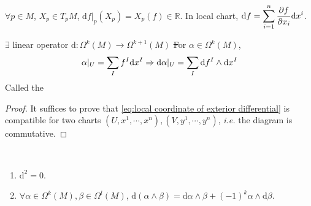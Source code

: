 $ \forall p\in M $,  $ X_p\in T_pM $,  $ \mathrm{d}f|_p(X_p)=X_p(f)\in \mathbb{R} $.
In local chart,  $ \mathrm{d}f=\displaystyle\sum_{i=1}^n\frac{\partial f}{\partial x_i}\mathrm{d}x^i $.
\begin{theorem}
    $ \exists $ linear operator  $ \mathrm{d}:\Omega^k(M)\rightarrow \Omega^{k+1}(M) $  \st
    For $ \alpha\in \Omega^k(M) $,
    \begin{equation}
        \alpha|_U=\displaystyle\sum_If^I\mathrm{d}x^I \Rightarrow \mathrm{d}\alpha|_U=\displaystyle\sum_{I}\mathrm{d}f^I\wedge\mathrm{d}x^I \label{eq:local coordinate of exterior differential}
    \end{equation}
    Called the 
\end{theorem}
\tikzset{external/export=false}
\begin{proof}
    It suffices to prove that \eqref{eq:local coordinate of exterior differential} is compatible for two charts  $ (U,x^1,\cdots,x^n),(V,y^1,\cdots,y^n) $, \textit{i.e.} the diagram is commutative.
    \footnotesize
\end{proof}
\tikzset{external/export=true}
\begin{theorem}
    \,
    \begin{enumerate}[label=(\arabic*)]
        \item $ \mathrm{d}^2=0 $.
        \item  $ \forall \alpha\in \Omega^k(M),\beta\in \Omega^l(M) $,  $ \mathrm{d}(\alpha\wedge\beta)=\mathrm{d}\alpha\wedge\beta+(-1)^{k}\alpha\wedge\mathrm{d}\beta $.
    \end{enumerate}
\end{theorem}
